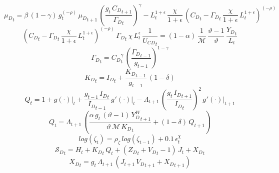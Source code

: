 \documentclass[10pt,a4paper]{article}
\begin{document}
\begin{dmath}
{{\mu}_{D}}_{t}=\beta\, \left(1-\gamma\right)\, {g}_{t}^{\left(-\rho\right)}\, {{\mu}_{D}}_{t+1}\, \left(\frac{{g}_{t}\, {C_D}_{t+1}}{{\Gamma_D}_{t}}\right)^{\gamma}-{L}_{t}^{1+\epsilon}\, \frac{\chi}{1+\epsilon}\, \left({C_D}_{t}-{\Gamma_D}_{t}\, \frac{\chi}{1+\epsilon}\, {L}_{t}^{1+\epsilon}\right)^{\left(-\rho\right)}
\end{dmath}
\begin{dmath}
\left({C_D}_{t}-{\Gamma_D}_{t}\, \frac{\chi}{1+\epsilon}\, {L}_{t}^{1+\epsilon}\right)^{\left(-\rho\right)}\, {\Gamma_D}_{t}\, \chi\, {L}_{t}^{\epsilon}\, \frac{1}{{U_{CD}}_{t}}=\left(1-\alpha\right)\, \frac{1}{\mathcal{M}}\, \frac{\vartheta-1}{\vartheta}\, \frac{{Y_D}_{t}}{{L}_{t}}
\end{dmath}
\begin{dmath}
{\Gamma_D}_{t}={C_D}_{t}^{\gamma}\, \left(\frac{{\Gamma_D}_{t-1}}{{g}_{t-1}}\right)^{1-\gamma}
\end{dmath}
\begin{dmath}
{K_D}_{t}={I_D}_{t}+\frac{{K_D}_{t-1}}{{g}_{t-1}}\, \left(1-\delta\right)
\end{dmath}
\begin{dmath}
{Q}_{t}=1+{\left.       g\left( \cdot \right)            \right|}_{t}+\frac{{g}_{t-1}\, {I_D}_{t}}{{I_D}_{t-1}}\, {\left.       g^‎{\prime}\left( \cdot \right)   \right|}_{t}-{\Lambda}_{t+1}\, \left(\frac{{g}_{t}\, {I_D}_{t+1}}{{I_D}_{t}}\right)^{2}\, {\left.       g^‎{\prime}\left( \cdot \right)   \right|}_{t+1}
\end{dmath}
\begin{dmath}
{Q}_{t}={\Lambda}_{t+1}\, \left(\frac{\alpha\, {g}_{t}\, \left(\vartheta-1\right)\, {Y^W_D}_{t+1}}{\vartheta\, \mathcal{M}\, {K_D}_{t}}+\left(1-\delta\right)\, {Q}_{t+1}\right)
\end{dmath}
\begin{dmath}
log\left({\zeta}_{t}\right)={\rho}_{\zeta}\, log\left({\zeta}_{t-1}\right)+0.1\, {\epsilon}^{\chi}_{t}
\end{dmath}
\begin{dmath}
{\mathcal{S}_{D}}_{t}={H}_{t}+{K_D}_{t}\, {Q}_{t}+\left({Z_D}_{t}+{V_D}_{t}-1\right)\, {J}_{t}+{X_D}_{t}
\end{dmath}
\begin{dmath}
{X_D}_{t}={g}_{t}\, {\Lambda}_{t+1}\, \left({J}_{t+1}\, {V_D}_{t+1}+{X_D}_{t+1}\right)
\end{dmath}
\end{document}

